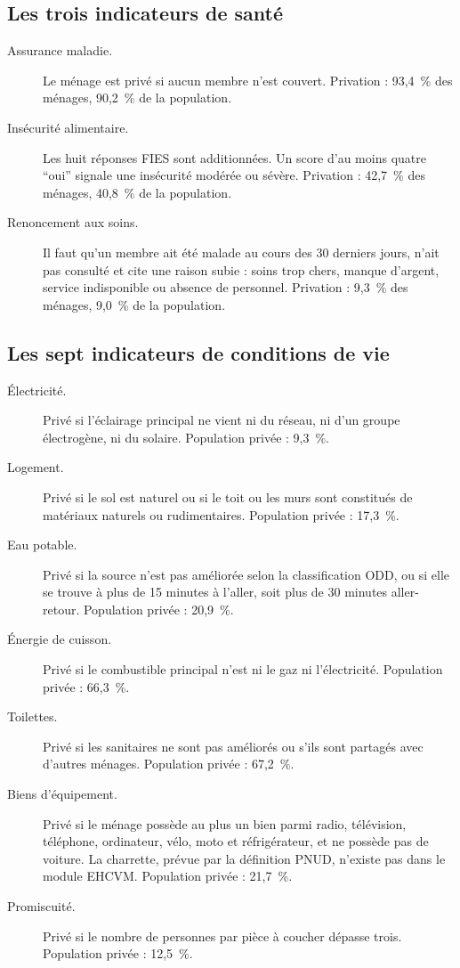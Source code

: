 \documentclass[11pt,a4paper]{article}
\begin{document}
\subsection{Les trois indicateurs de santé}

\begin{description}
  \item[Assurance maladie.] Le ménage est privé si aucun membre n'est couvert. Privation :
  93,4~\% des ménages, 90,2~\% de la population.

  \item[Insécurité alimentaire.] Les huit réponses FIES sont additionnées. Un score d'au moins
  quatre ``oui'' signale une insécurité modérée ou sévère. Privation : 42,7~\% des ménages,
  40,8~\% de la population.

  \item[Renoncement aux soins.] Il faut qu'un membre ait été malade au cours des 30 derniers
  jours, n'ait pas consulté et cite une raison subie : soins trop chers, manque d'argent, service
  indisponible ou absence de personnel. Privation : 9,3~\% des ménages, 9,0~\% de la population.
\end{description}

\subsection{Les sept indicateurs de conditions de vie}

\begin{description}
  \item[Électricité.] Privé si l'éclairage principal ne vient ni du réseau, ni d'un groupe
  électrogène, ni du solaire. Population privée : 9,3~\%.

  \item[Logement.] Privé si le sol est naturel ou si le toit ou les murs sont constitués de
  matériaux naturels ou rudimentaires. Population privée : 17,3~\%.

  \item[Eau potable.] Privé si la source n'est pas améliorée selon la classification ODD, ou si
  elle se trouve à plus de 15 minutes à l'aller, soit plus de 30 minutes aller-retour.
  Population privée : 20,9~\%.

  \item[Énergie de cuisson.] Privé si le combustible principal n'est ni le gaz ni l'électricité.
  Population privée : 66,3~\%.

  \item[Toilettes.] Privé si les sanitaires ne sont pas améliorés ou s'ils sont partagés avec
  d'autres ménages. Population privée : 67,2~\%.

  \item[Biens d'équipement.] Privé si le ménage possède au plus un bien parmi radio, télévision,
  téléphone, ordinateur, vélo, moto et réfrigérateur, et ne possède pas de voiture. La charrette,
  prévue par la définition PNUD, n'existe pas dans le module EHCVM. Population privée : 21,7~\%.

  \item[Promiscuité.] Privé si le nombre de personnes par pièce à coucher dépasse trois.
  Population privée : 12,5~\%.
\end{description}
\end{document}
